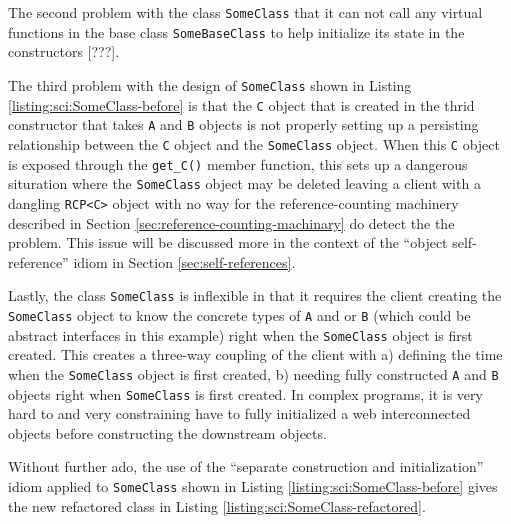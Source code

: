 \documentclass[pdf,ps2pdf,11pt]{SANDreport}
\begin{document}
The second problem with the class {}\texttt{SomeClass} that it can not
call any virtual functions in the base class {}\texttt{SomeBaseClass}
to help initialize its state in the constructors [???].

The third problem with the design of {}\texttt{SomeClass} shown in
Listing {}\ref{listing:sci:SomeClass-before} is that the {}\texttt{C}
object that is created in the thrid constructor that takes
{}\texttt{A} and {}\texttt{B} objects is not properly setting up a
persisting relationship between the {}\texttt{C} object and the
{}\texttt{SomeClass} object.  When this {}\texttt{C} object is exposed
through the {}\texttt{get\_C()} member function, this sets up a
dangerous situration where the {}\texttt{SomeClass} object may be
deleted leaving a client with a dangling {}\texttt{RCP<C>} object with
no way for the reference-counting machinery described in Section
{}\ref{sec:reference-counting-machinary} do detect the the problem.
This issue will be discussed more in the context of the ``object
self-reference'' idiom in Section {}\ref{sec:self-references}.

Lastly, the class {}\texttt{SomeClass} is inflexible in that it
requires the client creating the {}\texttt{SomeClass} object to know
the concrete types of {}\texttt{A} and or {}\texttt{B} (which could be
abstract interfaces in this example) right when the
{}\texttt{SomeClass} object is first created.  This creates a
three-way coupling of the client with a) defining the time when the
{}\texttt{SomeClass} object is first created, b) needing fully
constructed {}\texttt{A} and {}\texttt{B} objects right when
{}\texttt{SomeClass} is first created.  In complex programs, it is
very hard to and very constraining have to fully initialized a web
interconnected objects before constructing the downstream objects.

Without further ado, the use of the ``separate construction and
initialization'' idiom applied to {}\texttt{SomeClass} shown in
Listing {}\ref{listing:sci:SomeClass-before} gives the new refactored
class in Listing {}\ref{listing:sci:SomeClass-refactored}.
\end{document}
